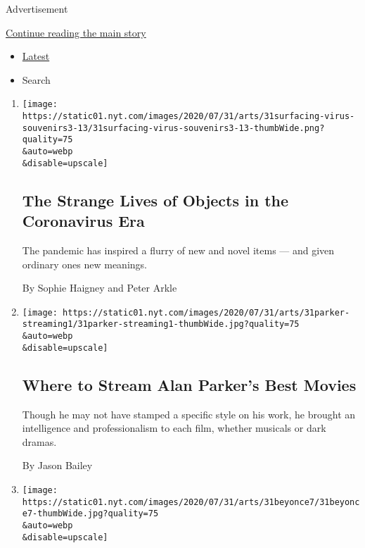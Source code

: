 Advertisement

\protect\hyperlink{after-mid1}{Continue reading the main story}

\begin{itemize}
\tightlist
\item
  \protect\hyperlink{stream-panel}{Latest}
\item
  Search
\end{itemize}

\begin{enumerate}
\def\labelenumi{\arabic{enumi}.}
\item
  \href{/2020/08/01/arts/design/virus-design-objects.html}{}

  \texttt{[image: https://static01.nyt.com/images/2020/07/31/arts/31surfacing-virus-souvenirs3-13/31surfacing-virus-souvenirs3-13-thumbWide.png?quality=75\\\&auto=webp\\\&disable=upscale]}

  \hypertarget{the-strange-lives-of-objects-in-the-coronavirus-era}{%
  \subsection{The Strange Lives of Objects in the Coronavirus
  Era}\label{the-strange-lives-of-objects-in-the-coronavirus-era}}

  The pandemic has inspired a flurry of new and novel items --- and
  given ordinary ones new meanings.

  By Sophie Haigney and Peter Arkle
\item
  \href{/2020/07/31/movies/alan-parker-stream.html}{}

  \texttt{[image: https://static01.nyt.com/images/2020/07/31/arts/31parker-streaming1/31parker-streaming1-thumbWide.jpg?quality=75\\\&auto=webp\\\&disable=upscale]}

  \hypertarget{where-to-stream-alan-parkers-best-movies}{%
  \subsection{Where to Stream Alan Parker's Best
  Movies}\label{where-to-stream-alan-parkers-best-movies}}

  Though he may not have stamped a specific style on his work, he
  brought an intelligence and professionalism to each film, whether
  musicals or dark dramas.

  By Jason Bailey
\item
  \href{/2020/07/31/arts/music/beyonce-black-is-king.html}{}

  \texttt{[image: https://static01.nyt.com/images/2020/07/31/arts/31beyonce7/31beyonce7-thumbWide.jpg?quality=75\\\&auto=webp\\\&disable=upscale]}


\end{enumerate}
